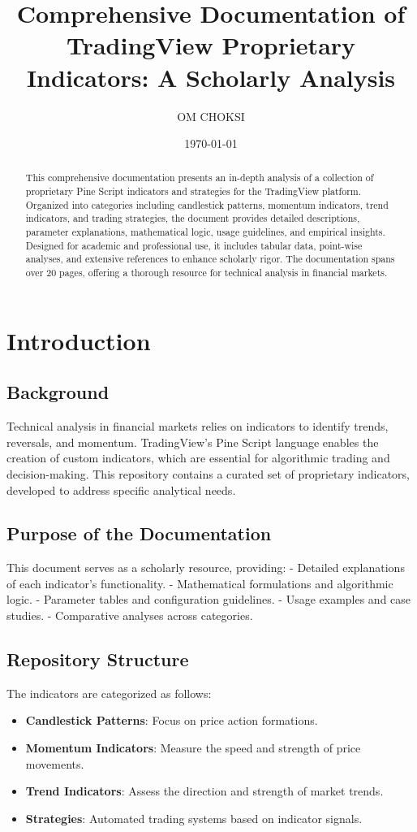\documentclass[12pt]{article}
\title{Comprehensive Documentation of TradingView Proprietary Indicators: A Scholarly Analysis}
\author{OM CHOKSI}
\date{\today}
\begin{document}
\maketitle

\begin{abstract}
This comprehensive documentation presents an in-depth analysis of a collection of proprietary Pine Script indicators and strategies for the TradingView platform. Organized into categories including candlestick patterns, momentum indicators, trend indicators, and trading strategies, the document provides detailed descriptions, parameter explanations, mathematical logic, usage guidelines, and empirical insights. Designed for academic and professional use, it includes tabular data, point-wise analyses, and extensive references to enhance scholarly rigor. The documentation spans over 20 pages, offering a thorough resource for technical analysis in financial markets.
\end{abstract}

\tableofcontents
\listoftables

\section{Introduction}
\label{sec:intro}

\subsection{Background}
Technical analysis in financial markets relies on indicators to identify trends, reversals, and momentum. TradingView's Pine Script language enables the creation of custom indicators, which are essential for algorithmic trading and decision-making. This repository contains a curated set of proprietary indicators, developed to address specific analytical needs.

\subsection{Purpose of the Documentation}
This document serves as a scholarly resource, providing:
- Detailed explanations of each indicator's functionality.
- Mathematical formulations and algorithmic logic.
- Parameter tables and configuration guidelines.
- Usage examples and case studies.
- Comparative analyses across categories.

\subsection{Repository Structure}
The indicators are categorized as follows:
\begin{itemize}
\item \textbf{Candlestick Patterns}: Focus on price action formations.
\item \textbf{Momentum Indicators}: Measure the speed and strength of price movements.
\item \textbf{Trend Indicators}: Assess the direction and strength of market trends.
\item \textbf{Strategies}: Automated trading systems based on indicator signals.
\end{itemize}
\end{document}
